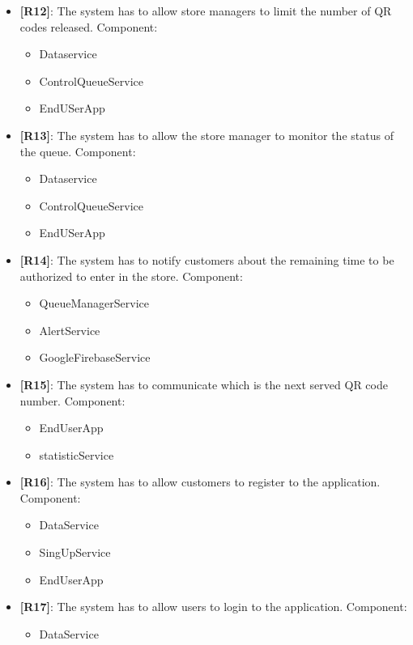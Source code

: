 \begin{itemize}
    \item {\textbf{[R12]}}: The system has to allow store managers to limit the number of QR codes released.
    Component:
    \begin{itemize}
        \item Dataservice
        \item ControlQueueService
        \item EndUSerApp
    \end{itemize}
    \item {\textbf{[R13]}}: The system has to allow the store manager to monitor the status of the queue.
    Component:
    \begin{itemize}
        \item Dataservice
        \item ControlQueueService
        \item EndUSerApp
    \end{itemize}
    \item {\textbf{[R14]}}: The system has to notify customers about the remaining time to be authorized to enter in the store.
    Component:
    \begin{itemize}
        \item QueueManagerService
        \item AlertService
        \item GoogleFirebaseService
    \end{itemize}
    \item {\textbf{[R15]}}: The system has to communicate which is the next served QR code number.
    Component:
    \begin{itemize}
        \item EndUserApp
        \item statisticService
    \end{itemize}
    \item {\textbf{[R16]}}: The system has to allow customers to register to the application.
    Component:
    \begin{itemize}
        \item DataService
        \item SingUpService
        \item EndUserApp
    \end{itemize}
    \item {\textbf{[R17]}}: The system has to allow users to login to the application.
    Component:
    \begin{itemize}
        \item DataService

\end{itemize}
\end{itemize}
